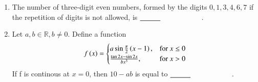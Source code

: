 \documentclass[journal,12pt,onecolumn]{IEEEtran}
\theoremstyle{remark}
\begin{document}
\begin{enumerate}
       \item The number of three-digit even numbers, formed by the digits $0, 1, 3, 4, 6, 7$ if the repetition of digits is not allowed, is $\makebox[3cm][l]{\underline{\hspace{1cm}}}$.
       \item Let $a,b \in \mathbb{R}, b\neq 0$. Define a function 
       \[
       f\left(x\right)=
       \begin{cases}
           a\sin\frac{\pi}{2}\left(x-1\right),&\text{for }x\leq 0\\
           \frac{\tan 2x -\sin 2x}{bx^{3}},&\text{for }x>0
       \end{cases}
       \]
       If f is continous at $x=0$, then $10-ab$ is equal to  $\makebox[3cm][l]{\underline{\hspace{1cm}}}$.
\end{enumerate}
\end{document}
